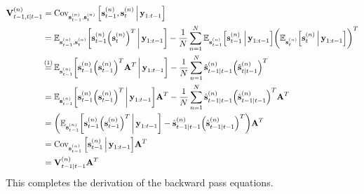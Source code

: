 		\begin{align*}
			\mat{V}_{t - 1, t \subgiven t - 1}^{(n)}
				&= \Cov_{\vec{s}_{t - 1}^{(n)}, \vec{s}_t^{(n)}}\Big[\vec{s}_{t - 1}^{(n)}, \vec{s}_t^{(n)} \Biggiven \vec{y}_{1:t - 1}\Big] \\
				&= \E_{\vec{s}_{t - 1}^{(n)}, \vec{s}_t^{(n)}}\bigg[\vec{s}_{t - 1}^{(n)} \Big(\vec{s}_t^{(n)}\Big)^T \bigggiven \vec{y}_{1:t - 1}\bigg] - \frac{1}{N} \sum_{n = 1}^{N} \E_{\vec{s}_{t - 1}^{(n)}}\Big[\vec{s}_{t - 1}^{(n)} \Biggiven \vec{y}_{1:t - 1}\Big] \bigg( \E_{\vec{s}_t^{(n)}}\Big[\vec{s}_t^{(n)} \Biggiven \vec{y}_{1:t - 1}\Big] \bigg)^T \\
				&\oversetfootnotemark{=} \E_{\vec{s}_{t - 1}^{(n)}}\bigg[\vec{s}_{t - 1}^{(n)} \Big(\vec{s}_{t - 1}^{(n)}\Big)^T \mat{A}^T \bigggiven \vec{y}_{1:t - 1}\bigg] - \frac{1}{N} \sum_{n = 1}^{N} \hat{\vec{s}}_{t - 1 \subgiven t - 1}^{(n)} \Big(\hat{\vec{s}}_{t \subgiven t - 1}^{(n)}\Big)^T \\
				&= \E_{\vec{s}_{t - 1}^{(n)}}\bigg[\vec{s}_{t - 1}^{(n)} \Big(\vec{s}_{t - 1}^{(n)}\Big)^T \bigggiven \vec{y}_{1:t - 1}\bigg] \mat{A}^T - \frac{1}{N} \sum_{n = 1}^{N} \hat{\vec{s}}_{t - 1 \subgiven t - 1}^{(n)} \Big( \hat{\vec{s}}_{t - 1 \subgiven t - 1}^{(n)} \Big)^T \mat{A}^T \\
				&= \bigg( \E_{\vec{s}_{t - 1}^{(n)}}\bigg[\vec{s}_{t - 1}^{(n)} \Big(\vec{s}_{t - 1}^{(n)}\Big)^T \bigggiven \vec{y}_{1:t - 1}\bigg] - \hat{\vec{s}}_{t - 1 \subgiven t - 1}^{(n)} \Big( \hat{\vec{s}}_{t - 1 \subgiven t - 1}^{(n)} \Big)^T \bigg) \mat{A}^T \\
				&= \Cov_{\vec{s}_{t - 1}^{(n)}}\Big[\vec{s}_{t - 1}^{(n)} \Biggiven \vec{y}_{1:t - 1}\Big] \mat{A}^T \\
				&= \mat{V}_{t - 1 \subgiven t - 1}^{(n)} \mat{A}^T
		\end{align*}
		This completes the derivation of the backward pass equations.

